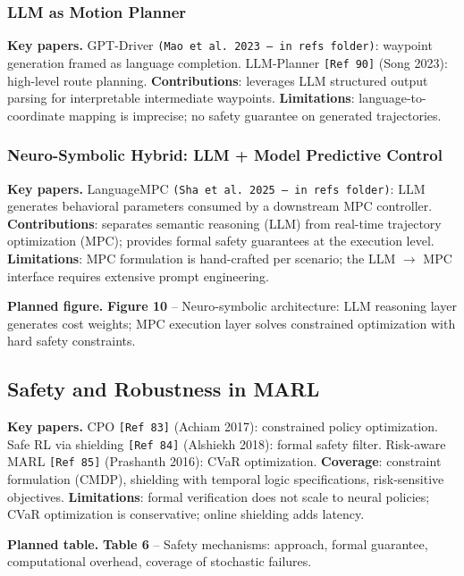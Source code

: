 \documentclass[12pt, a4paper]{article}
\begin{document}
\subsubsection{LLM as Motion Planner}

\begin{outline_note}
\textbf{Key papers.}
GPT-Driver \texttt{(Mao et al.\ 2023 -- in refs folder)}:
waypoint generation framed as language completion.
LLM-Planner \texttt{[Ref\,90]} (Song 2023): high-level route planning.
\textbf{Contributions}: leverages LLM structured output parsing for
interpretable intermediate waypoints.
\textbf{Limitations}: language-to-coordinate mapping is imprecise;
no safety guarantee on generated trajectories.
\end{outline_note}

\subsubsection{Neuro-Symbolic Hybrid: LLM + Model Predictive Control}

\begin{outline_note}
\textbf{Key papers.}
LanguageMPC \texttt{(Sha et al.\ 2025 -- in refs folder)}: LLM generates
behavioral parameters consumed by a downstream MPC controller.
\textbf{Contributions}: separates semantic reasoning (LLM) from
real-time trajectory optimization (MPC); provides formal safety guarantees
at the execution level.
\textbf{Limitations}: MPC formulation is hand-crafted per scenario;
the LLM $\to$ MPC interface requires extensive prompt engineering.

\textbf{Planned figure.}
\textbf{Figure 10} -- Neuro-symbolic architecture: LLM reasoning layer
generates cost weights; MPC execution layer solves constrained optimization
with hard safety constraints.
\end{outline_note}

\subsection{Safety and Robustness in MARL}
\label{sec:safety}

\begin{outline_note}
\textbf{Key papers.}
CPO \texttt{[Ref\,83]} (Achiam 2017): constrained policy optimization.
Safe RL via shielding \texttt{[Ref\,84]} (Alshiekh 2018): formal safety filter.
Risk-aware MARL \texttt{[Ref\,85]} (Prashanth 2016): CVaR optimization.
\textbf{Coverage}: constraint formulation (CMDP), shielding with
temporal logic specifications, risk-sensitive objectives.
\textbf{Limitations}: formal verification does not scale to neural policies;
CVaR optimization is conservative; online shielding adds latency.

\textbf{Planned table.}
\textbf{Table 6} -- Safety mechanisms: approach, formal guarantee,
computational overhead, coverage of stochastic failures.
\end{outline_note}
\end{document}
